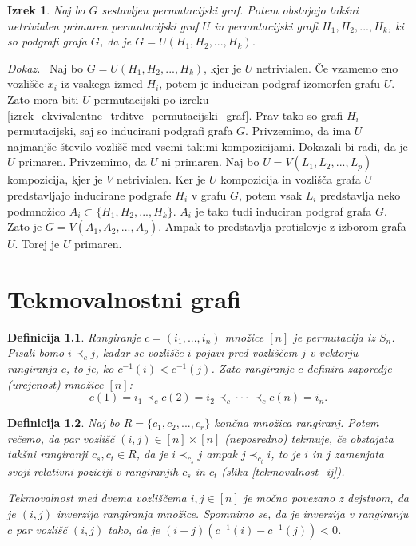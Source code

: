 \documentclass[a4paper, 12pt]{book}
\newtheorem{definicija}{Definicija}[chapter]
\newtheorem{izrek}{Izrek}[chapter]
\newenvironment{dokaz}{\emph{Dokaz.}\ }{\hspace{\fill}{$\Box$}}
\begin{document}
\begin{izrek}
    Naj bo $G$ sestavljen permutacijski graf. Potem obstajajo takšni netrivialen primaren permutacijski graf $U$ in permutacijski grafi $H_1, H_2, ..., H_k$, ki so podgrafi grafa $G$, da je $G = U(H_1, H_2, ..., H_k)$.
\end{izrek}
\begin{dokaz}
    Naj bo $G = U(H_1, H_2, ..., H_k)$, kjer je $U$ netrivialen. Če vzamemo eno vozlišče $x_i$ iz vsakega izmed $H_i$, potem je induciran podgraf izomorfen grafu $U$. Zato mora biti $U$ permutacijski po izreku \ref{izrek_ekvivalentne_trditve_permutacijski_graf}. Prav tako so grafi $H_i$ permutacijski, saj so inducirani podgrafi grafa $G$. Privzemimo, da ima $U$ najmanjše število vozlišč med vsemi takimi kompozicijami. Dokazali bi radi, da je $U$ primaren. Privzemimo, da $U$ ni primaren. Naj bo $U = V(L_1, L_2, ..., L_p)$ kompozicija, kjer je $V$ netrivialen. Ker je $U$ kompozicija in vozlišča grafa $U$ predstavljajo inducirane podgrafe $H_i$ v grafu $G$, potem vsak $L_i$ predstavlja neko podmnožico $A_i \subset \{ H_1, H_2, ..., H_k \}$. $A_i$ je tako tudi induciran podgraf grafa $G$. Zato je $G = V(A_1, A_2, ..., A_p)$. Ampak to predstavlja protislovje z izborom grafa $U$. Torej je $U$ primaren.
\end{dokaz}

\chapter{ Tekmovalnostni grafi }

\begin{definicija}
    Rangiranje $c = (i_1, ..., i_n)$ množice $[n]$ je permutacija iz $S_n$. Pisali bomo $i \prec_c j$, kadar se vozlišče $i$ pojavi pred vozliščem $j$ v vektorju rangiranja $c$, to je, ko $c^{-1}(i) < c^{-1}(j)$. Zato rangiranje $c$ definira zaporedje (urejenost) množice $[n]$:
    \[
        c(1) = i_1 \prec_c c(2) = i_2 \prec_c \cdot\cdot\cdot \prec_c c(n) = i_n.
    \]
\end{definicija}

\begin{definicija}
\label{def_tekmovalnosti}
    Naj bo $R = \{c_1, c_2, ..., c_r\}$ končna množica rangiranj. Potem rečemo, da par vozlišč $(i, j) \in [n] \times [n]$ (neposredno) tekmuje, če obstajata takšni rangiranji $c_s, c_t \in R$, da je $i \prec_{c_s} j$ ampak $j \prec_{c_t} i$, to je $i$ in $j$ zamenjata svoji relativni poziciji v rangiranjih $c_s$ in $c_t$ (slika \ref{tekmovalnost_ij}).

    Tekmovalnost med dvema vozliščema $i, j \in [n]$ je močno povezano z dejstvom, da je $(i, j)$ inverzija rangiranja množice. Spomnimo se, da je inverzija v rangiranju $c$ par vozlišč $(i, j)$ tako, da je $(i-j)(c^{-1}(i) - c^{-1}(j)) < 0$.
\end{definicija}
\end{document}
